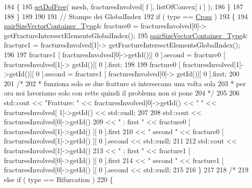 \begin{DoxyCode}
184                \{
185                    \hyperlink{classFractureIntersect_a5290dda06af2f6ba24a37f93d3bb4e95}{setDofFree}( mesh, fracturesInvolved[ f ], listOfConvex[ i ] );
186                \}
187 
188            \}
189 
190             
191            \textcolor{comment}{// Stampe dei GlobalIndex}
192            \textcolor{keywordflow}{if} ( type == \hyperlink{classFractureIntersect_a9a4e4a784fa4c8e359767ed543f89dc5a743fef1af81c0e61412fafb9438b380e}{Cross} )
193            \{
194                \hyperlink{Core_8h_a9bc476e433f99b82a9c2b8560735c7b5}{pairSizeVectorContainer\_Type}& fracture0 = fracturesInvolved[0]->
      getFractureIntersectElementsGlobalIndex();
195                \hyperlink{Core_8h_a9bc476e433f99b82a9c2b8560735c7b5}{pairSizeVectorContainer\_Type}& fracture1 = fracturesInvolved[1]->
      getFractureIntersectElementsGlobalIndex();
196                 
197                 fracture1 [ fracturesInvolved[0]->getId()][ 0 ].second = fracture0 [ fracturesInvolved[1]->
      getId()][ 0 ].first;
198     
199                 fracture0 [ fracturesInvolved[1]->getId()][ 0 ].second = fracture1 [ fracturesInvolved[0]->
      getId()][ 0 ].first;
200                 
201                 \textcolor{comment}{/*}
202 \textcolor{comment}{                 * funziona solo se due fratture si intersecano una volta sola}
203 \textcolor{comment}{                 * per ora noi lavoriamo solo con rette quindi il problema non si pone}
204 \textcolor{comment}{                 */}
205     
206                 std::cout << \textcolor{stringliteral}{"Fratture: "} << fracturesInvolved[0]->getId() << \textcolor{stringliteral}{"     "} << fracturesInvolved[
      1]->getId() << std::endl;
207     
208                 std::cout << fracturesInvolved[0]->getId()
209                                 << \textcolor{stringliteral}{" :   first "} << fracture0 [ fracturesInvolved[1]->getId() ][ 0 ].first
210                                 << \textcolor{stringliteral}{" second "} << fracture0 [ fracturesInvolved[1]->getId() ][ 0 ].second <<
       std::endl;
211     
212                 std::cout << fracturesInvolved[1]->getId()
213                                 << \textcolor{stringliteral}{" :   first "} << fracture1 [ fracturesInvolved[0]->getId() ][ 0 ].first
214                                 << \textcolor{stringliteral}{" second "} << fracture1 [ fracturesInvolved[0]->getId() ][ 0 ].second <<
       std::endl;
215     
216             \}
217 
218             \textcolor{comment}{/*}
219 \textcolor{comment}{            else if ( type == Bifurcation )}
220 \textcolor{comment}{            \{    }

\end{DoxyCode}
